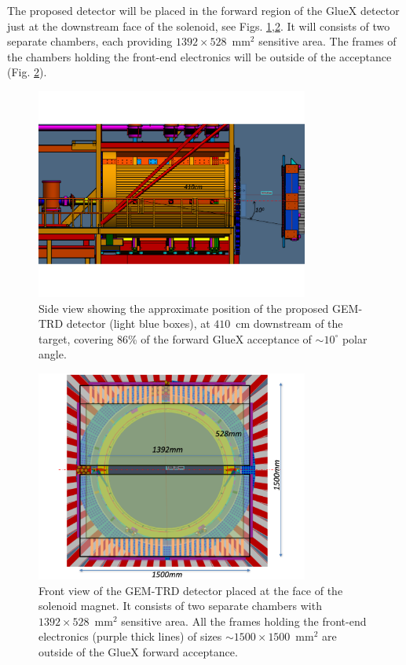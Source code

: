 \documentclass[%
preprint,
nofootinbib,
 amsmath,amssymb,
 aps,
floatfix,
]{revtex4-1}
\begin{document}
The proposed detector will be placed in the forward region
of the GlueX detector just at the downstream face of the solenoid,
see Figs. \ref{fig:side_view},\ref{fig:front_view}.
It will consists of two separate chambers,
each providing $1392 \times 528$~mm$^2$ sensitive area. 
The frames of the chambers holding the front-end electronics
will be outside of the acceptance (Fig. \ref{fig:front_view}).
\begin{figure}[]
\includegraphics[width=0.80\textwidth]{./fig/GEM_TRD_side.pdf}
  \caption{
Side view showing the approximate position of the proposed GEM-TRD detector
(light blue boxes), at $410$~cm downstream of the target,
covering $86$\% of the forward GlueX acceptance of $\sim 10^\circ$ 
polar angle.
}
  \label{fig:side_view}
\end{figure}
\begin{figure}[]
\includegraphics[width=0.80\textwidth]{./fig/GEM_TRD_full.pdf}
  \caption{
Front view of the GEM-TRD detector placed at the face of the solenoid
magnet. It consists of two separate chambers with $1392 \times 528$~mm$^2$
sensitive area. All the frames holding the front-end electronics
(purple thick lines) 
of sizes $\sim 1500 \times 1500$~mm$^2$
are outside of the GlueX forward acceptance.
}
  \label{fig:front_view}
\end{figure}
\end{document}
